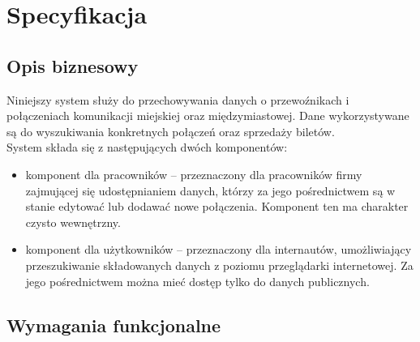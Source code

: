 \documentclass[10pt,a4paper]{article}
\begin{document}
\newpage
\tableofcontents
\newpage

\section{Specyfikacja}

\subsection{Opis biznesowy}
Niniejszy system służy do przechowywania danych o przewoźnikach i połączeniach komunikacji miejskiej oraz międzymiastowej. Dane wykorzystywane są do wyszukiwania konkretnych połączeń oraz sprzedaży biletów.\\[\baselineskip]
System składa się z następujących dwóch komponentów:
\begin{itemize}
	\item komponent dla pracowników -- przeznaczony dla pracowników firmy zajmującej się udostępnianiem danych, którzy za jego pośrednictwem są w stanie edytować lub dodawać nowe połączenia. Komponent ten ma charakter czysto wewnętrzny.
	\item komponent dla użytkowników -- przeznaczony dla internautów, umożliwiający przeszukiwanie składowanych danych z poziomu przeglądarki internetowej. Za jego pośrednictwem można mieć dostęp tylko do danych publicznych.
\end{itemize}

\subsection{Wymagania funkcjonalne}
\end{document}
